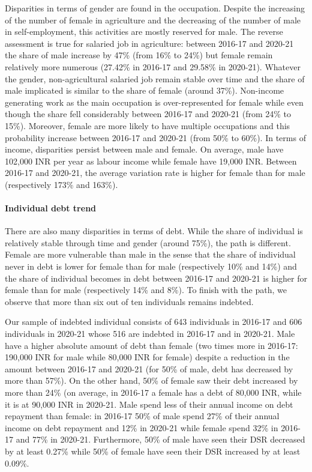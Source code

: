 \documentclass[a4paper, 11pt, onecolumn]{article}
\begin{document}
Disparities in terms of gender are found in the occupation.
Despite the increasing of the number of female in agriculture and the decreasing of the number of male in self-employment, this activities are mostly reserved for male.
The reverse assessment is true for salaried job in agriculture: between 2016-17 and 2020-21 the share of male increase by 47\% (from 16\% to 24\%) but female remain relatively more numerous (27.42\% in 2016-17 and 29.58\% in 2020-21). 
Whatever the gender, non-agricultural salaried job remain stable over time and the share of male implicated is similar to the share of female (around 37\%).
Non-income generating work as the main occupation is over-represented for female while even though the share fell considerably between 2016-17 and 2020-21 (from 24\% to 15\%).
Moreover, female are more likely to have multiple occupations and this probability increase between 2016-17 and 2020-21 (from 50\% to 60\%).
In terms of income, disparities persist between male and female.
On average, male have 102,000 INR per year as labour income while female have 19,000 INR.
Between 2016-17 and 2020-21, the average variation rate is higher for female than for male (respectively 173\% and 163\%).

\paragraph{Individual debt trend}
There are also many disparities in terms of debt.
While the share of individual is relatively stable through time and gender (around 75\%), the path is different.
Female are more vulnerable than male in the sense that the share of individual never in debt is lower for female than for male (respectively 10\% and 14\%) and the share of individual becomes in debt between 2016-17 and 2020-21 is higher for female than for male (respectively 14\% and 8\%).
To finish with the path, we observe that more than six out of ten individuals remains indebted.

Our sample of indebted individual consists of 643 individuals in 2016-17 and 606 individuals in 2020-21 whose 516 are indebted in 2016-17 and in 2020-21.
Male have a higher absolute amount of debt than female (two times more in 2016-17: 190,000 INR for male while 80,000 INR for female) despite a reduction in the amount between 2016-17 and 2020-21 (for 50\% of male, debt has decreased by more than 57\%).
On the other hand, 50\% of female saw their debt increased by more than 24\% (on average, in 2016-17 a female has a debt of 80,000 INR, while it is at 90,000 INR in 2020-21.
Male spend less of their annual income on debt repayment than female: in 2016-17 50\% of male spend 27\% of their annual income on debt repayment and 12\% in 2020-21 while female spend 32\% in 2016-17 and 77\% in 2020-21.
Furthermore, 50\% of male have seen their DSR decreased by at least 0.27\% while 50\% of female have seen their DSR increased by at least 0.09\%.
\end{document}
